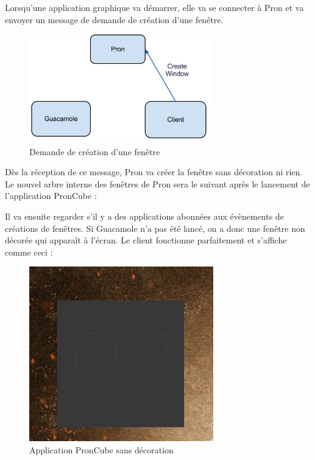 Lorsqu'une application graphique va démarrer, elle va se connecter à Pron et va envoyer un message de demande de création d'une fenêtre.

\begin{figure}[H]
  \centering
  \includegraphics[width=8cm]{images/Guacamole_anim_2.jpg}
  \caption{Demande de création d'une fenêtre}
  \label{fig:guacamole_anim_2}
\end{figure}

Dès la réception de ce message, Pron va créer la fenêtre sans décoration ni rien.
Le nouvel arbre interne des fenêtres de Pron sera le suivant après le lancement de l'application PronCube :

\begin{center}
\end{center}

Il va ensuite regarder s'il y a des applications abonnées aux évènements de créations de fenêtres.
Si Guacamole n'a pas été lancé, on a donc une fenêtre non décorée qui apparaît à l'écran.
Le client fonctionne parfaitement et s'affiche comme ceci :

\begin{figure}[H]
  \centering
  \includegraphics[width=8cm]{images/pron_cube_sans_decoration.jpg}
  \caption{Application PronCube sans décoration}
  \label{fig:pron_cube_sans_decoration}
\end{figure}

